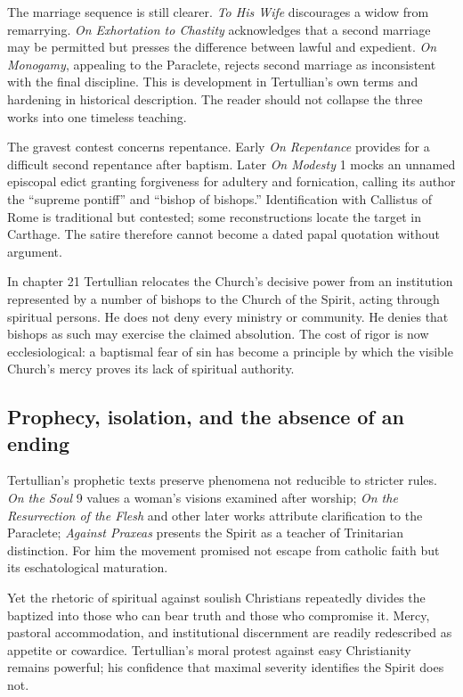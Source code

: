 The marriage sequence is still clearer. \emph{To His Wife} discourages a widow
from remarrying. \emph{On Exhortation to Chastity} acknowledges that a second
marriage may be permitted but presses the difference between lawful and
expedient. \emph{On Monogamy}, appealing to the Paraclete, rejects second
marriage as inconsistent with the final discipline. This is development in
Tertullian's own terms and hardening in historical description. The reader
should not collapse the three works into one timeless teaching.

The gravest contest concerns repentance. Early \emph{On Repentance} provides
for a difficult second repentance after baptism. Later \emph{On Modesty} 1
mocks an unnamed episcopal edict granting forgiveness for adultery and
fornication, calling its author the ``supreme pontiff'' and ``bishop of
bishops.'' Identification with Callistus of Rome is traditional but contested;
some reconstructions locate the target in Carthage. The satire therefore cannot
become a dated papal quotation without argument.

In chapter 21 Tertullian relocates the Church's decisive power from an
institution represented by a number of bishops to the Church of the Spirit,
acting through spiritual persons. He does not deny every ministry or community.
He denies that bishops as such may exercise the claimed absolution. The cost of
rigor is now ecclesiological: a baptismal fear of sin has become a principle by
which the visible Church's mercy proves its lack of spiritual authority.

\subsection{Prophecy, isolation, and the absence of an ending}

Tertullian's prophetic texts preserve phenomena not reducible to stricter rules.
\emph{On the Soul} 9 values a woman's visions examined after worship;
\emph{On the Resurrection of the Flesh} and other later works attribute
clarification to the Paraclete; \emph{Against Praxeas} presents the Spirit as a
teacher of Trinitarian distinction. For him the movement promised not escape
from catholic faith but its eschatological maturation.

Yet the rhetoric of spiritual against soulish Christians repeatedly divides
the baptized into those who can bear truth and those who compromise it. Mercy,
pastoral accommodation, and institutional discernment are readily redescribed
as appetite or cowardice. Tertullian's moral protest against easy Christianity
remains powerful; his confidence that maximal severity identifies the Spirit
does not.

